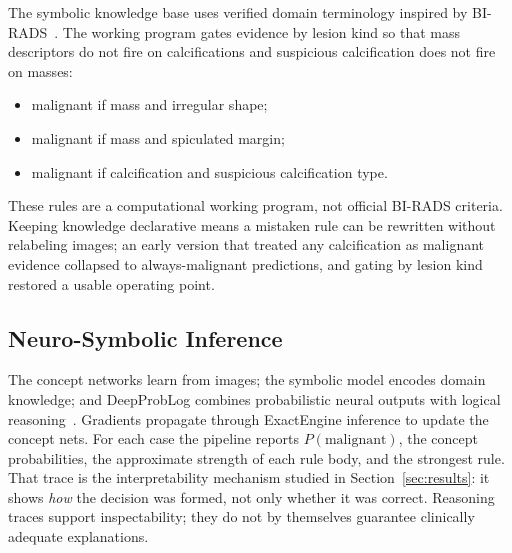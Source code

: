 The symbolic knowledge base uses verified domain terminology inspired by BI-RADS~\cite{acr2013birads}. The working program gates evidence by lesion kind so that mass descriptors do not fire on calcifications and suspicious calcification does not fire on masses:

\begin{itemize}
\item malignant if mass and irregular shape;
\item malignant if mass and spiculated margin;
\item malignant if calcification and suspicious calcification type.
\end{itemize}

These rules are a computational working program, not official BI-RADS criteria. Keeping knowledge declarative means a mistaken rule can be rewritten without relabeling images; an early version that treated any calcification as malignant evidence collapsed to always-malignant predictions, and gating by lesion kind restored a usable operating point.

\subsection{Neuro-Symbolic Inference}
\label{sec:inference}

The concept networks learn from images; the symbolic model encodes domain knowledge; and DeepProbLog combines probabilistic neural outputs with logical reasoning~\cite{manhaeve2021neural}. Gradients propagate through ExactEngine inference to update the concept nets. For each case the pipeline reports $P(\mathrm{malignant})$, the concept probabilities, the approximate strength of each rule body, and the strongest rule. That trace is the interpretability mechanism studied in Section~\ref{sec:results}: it shows \emph{how} the decision was formed, not only whether it was correct. Reasoning traces support inspectability; they do not by themselves guarantee clinically adequate explanations.

